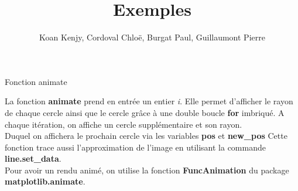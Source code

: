 \documentclass[aspectratio=169]{beamer}
\begin{document}
\begin{frame}{Fonction animate}

La fonction \textbf{animate} prend en entrée un entier \textit{i}. Elle permet d'afficher le rayon de chaque cercle ainsi que le cercle grâce à une double boucle  \textbf{for} imbriqué. A chaque itération, on affiche un cercle supplémentaire et son rayon. \\
Duquel on affichera le prochain cercle via les variables \textbf{pos} et \textbf{new\_pos} 
Cette fonction trace aussi l'approximation de l'image en utilisant la commande \textbf{line.set\_data}.\\
\bigskip
Pour avoir un rendu animé, on utilise la fonction \textbf{FuncAnimation} du package \textbf{matplotlib.animate}.

\end{frame}


\author{Koan Kenjy, Cordoval Chloë, Burgat Paul, Guillaumont Pierre}

\title[Présentation du Projet de Développement Logiciel]{Exemples}

\begin{frame}
    \titlepage
    \vspace{-10pt}
\end{frame}
\end{document}
